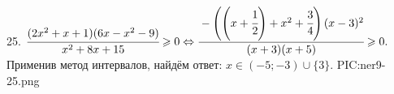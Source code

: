 25. $\cfrac{(2x^2+x+1)(6x-x^2-9)}{x^2+8x+15}\geqslant0\Leftrightarrow \cfrac{-\left(\left(x+\cfrac{1}{2}\right)+x^2+\cfrac{3}{4}\right)(x-3)^2}{(x+3)(x+5)}\geqslant0.$ Применив метод интервалов, найдём ответ: $x\in
(-5;-3)\cup\{3\}.$
{{PIC:ner9-25.png}}\\
